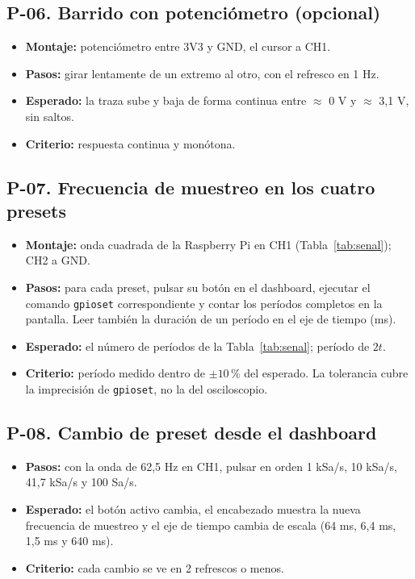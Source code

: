 \documentclass[12pt,a4paper]{article}
\begin{document}
\subsection*{P-06. Barrido con potenciómetro (opcional)}
\begin{itemize}
  \item \textbf{Montaje:} potenciómetro entre 3V3 y GND, el cursor a CH1.
  \item \textbf{Pasos:} girar lentamente de un extremo al otro, con el refresco en 1 Hz.
  \item \textbf{Esperado:} la traza sube y baja de forma continua entre $\approx$ 0 V y $\approx$ 3{,}1 V, sin saltos.
  \item \textbf{Criterio:} respuesta continua y monótona.
\end{itemize}

\subsection*{P-07. Frecuencia de muestreo en los cuatro presets}
\begin{itemize}
  \item \textbf{Montaje:} onda cuadrada de la Raspberry Pi en CH1 (Tabla~\ref{tab:senal}); CH2 a GND.
  \item \textbf{Pasos:} para cada preset, pulsar su botón en el dashboard, ejecutar el comando \texttt{gpioset} correspondiente y contar los períodos completos en la pantalla. Leer también la duración de un período en el eje de tiempo (ms).
  \item \textbf{Esperado:} el número de períodos de la Tabla~\ref{tab:senal}; período de $2t$.
  \item \textbf{Criterio:} período medido dentro de $\pm 10\,\%$ del esperado. La tolerancia cubre la imprecisión de \texttt{gpioset}, no la del osciloscopio.
\end{itemize}

\subsection*{P-08. Cambio de preset desde el dashboard}
\begin{itemize}
  \item \textbf{Pasos:} con la onda de 62{,}5 Hz en CH1, pulsar en orden 1 kSa/s, 10 kSa/s, 41{,}7 kSa/s y 100 Sa/s.
  \item \textbf{Esperado:} el botón activo cambia, el encabezado muestra la nueva frecuencia de muestreo y el eje de tiempo cambia de escala (64 ms, 6{,}4 ms, 1{,}5 ms y 640 ms).
  \item \textbf{Criterio:} cada cambio se ve en 2 refrescos o menos.
\end{itemize}
\end{document}

